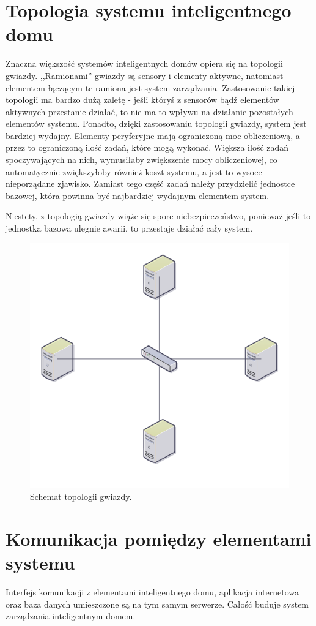 \documentclass[eng,oneside]{mgr}
\begin{document}
\section{Topologia systemu inteligentnego domu}
\label{sec:topologia_systemu}
Znaczna większość systemów inteligentnych domów opiera się na topologii gwiazdy. ,,Ramionami'' gwiazdy są sensory i elementy aktywne, natomiast elementem łączącym te ramiona jest system zarządzania. Zastosowanie takiej topologii ma bardzo dużą zaletę - jeśli któryś z sensorów bądź elementów aktywnych przestanie działać, to nie ma to wpływu na działanie pozostałych elementów systemu. Ponadto, dzięki zastosowaniu topologii gwiazdy, system jest bardziej wydajny. Elementy peryferyjne mają ograniczoną moc obliczeniową, a przez to ograniczoną ilość zadań, które mogą wykonać. Większa ilość zadań spoczywających na nich, wymusiłaby zwiększenie mocy obliczeniowej, co automatycznie zwiększyłoby również koszt systemu, a jest to wysoce nieporządane zjawisko. Zamiast tego część zadań należy przydzielić jednostce bazowej, która powinna być najbardziej wydajnym elementem system.


Niestety, z topologią gwiazdy wiąże się spore niebezpieczeństwo, ponieważ jeśli to jednostka bazowa ulegnie awarii, to przestaje działać cały system. 

\begin{figure}[h]
\centering
\includegraphics[width=0.6\linewidth]{topologia_gwiazdy}
\caption{Schemat topologii gwiazdy.}
\label{fig:star-network}
\end{figure}

\section{Komunikacja pomiędzy elementami systemu} %
\label{sec:komunikacja_pomi_dzy_elementami_systemu}
Interfejs komunikacji z elementami inteligentnego domu, aplikacja internetowa oraz baza danych umieszczone są na tym samym serwerze. Całość buduje system zarządzania inteligentnym domem.
\end{document}
